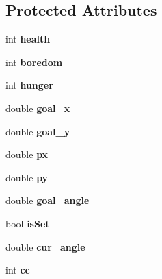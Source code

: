 \subsection*{Protected Attributes}
\begin{DoxyCompactItemize}
\item 
\hypertarget{classResident_ac603d9684120e1ab66a4340797bb7e90}{int {\bfseries health}}\label{classResident_ac603d9684120e1ab66a4340797bb7e90}

\item 
\hypertarget{classResident_acc61e75ef963ee7a6945b4d2ae9c55e6}{int {\bfseries boredom}}\label{classResident_acc61e75ef963ee7a6945b4d2ae9c55e6}

\item 
\hypertarget{classResident_a337df4272a4640a4039dfbe5c5c4a6d6}{int {\bfseries hunger}}\label{classResident_a337df4272a4640a4039dfbe5c5c4a6d6}

\item 
\hypertarget{classResident_adee57a6649dfa4a41d027fbb8d961226}{double {\bfseries goal\-\_\-x}}\label{classResident_adee57a6649dfa4a41d027fbb8d961226}

\item 
\hypertarget{classResident_a30e28a999b67c4db3500c9c3c9989a10}{double {\bfseries goal\-\_\-y}}\label{classResident_a30e28a999b67c4db3500c9c3c9989a10}

\item 
\hypertarget{classResident_aa147b3e473b2ea32b732eb5146ec7e34}{double {\bfseries px}}\label{classResident_aa147b3e473b2ea32b732eb5146ec7e34}

\item 
\hypertarget{classResident_ac757cac74a1712dd5746d1c3f5702a21}{double {\bfseries py}}\label{classResident_ac757cac74a1712dd5746d1c3f5702a21}

\item 
\hypertarget{classResident_a194117576f1937cac43ac1b05b884085}{double {\bfseries goal\-\_\-angle}}\label{classResident_a194117576f1937cac43ac1b05b884085}

\item 
\hypertarget{classResident_ac5e7527b191e07372c3ea5e9aa81a65d}{bool {\bfseries is\-Set}}\label{classResident_ac5e7527b191e07372c3ea5e9aa81a65d}

\item 
\hypertarget{classResident_a4781565db7a2e58566d2120623fbc13e}{double {\bfseries cur\-\_\-angle}}\label{classResident_a4781565db7a2e58566d2120623fbc13e}

\item 
\hypertarget{classResident_ab17c0dfd1b011b6e166f987f823892da}{int {\bfseries cc}}\label{classResident_ab17c0dfd1b011b6e166f987f823892da}


\end{DoxyCompactItemize}

